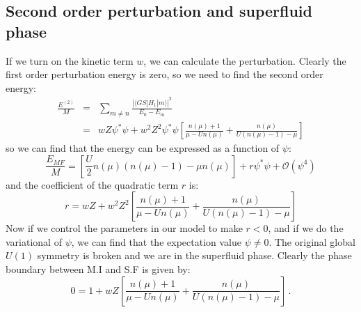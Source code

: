 \documentclass{article}
\begin{document}
\subsection{Second order perturbation and superfluid phase}
If we turn on the kinetic term $w$, we can calculate the perturbation. Clearly the first order perturbation energy is zero, so we need to find the second order energy:
\begin{eqnarray}
\frac{E^{(2)}}{M} &=& \sum_{m\neq n}\frac{|\langle GS|H_1|m\rangle|^2}{E_0-E_m}\nonumber\\
&=& wZ\psi^*\psi + w^2Z^2\psi^*\psi\left[\frac{n(\mu)+1}{\mu-Un(\mu)}+\frac{n(\mu)}{U(n(\mu)-1)-\mu}\right]
\end{eqnarray}
so we can find that the energy can be expressed as a function of $\psi$:
\begin{equation}
\frac{E_{MF}}{M} = \left[\frac{U}{2}n(\mu)(n(\mu)-1)-\mu n(\mu)\right] + r\psi^*\psi +\mathcal{O}(\psi^4)
\end{equation}
and the coefficient of the quadratic term $r$ is:
\begin{equation}
r = wZ + w^2Z^2\left[\frac{n(\mu)+1}{\mu-Un(\mu)}+\frac{n(\mu)}{U(n(\mu)-1)-\mu}\right] 
\end{equation}
Now if we control the parameters in our model to make $r<0$, and if we do the variational of $\psi$, we can find that the expectation value $\psi\neq 0$. The original global $U(1)$ symmetry is broken and we are in the superfluid phase. Clearly the phase boundary between M.I and S.F is given by:
\begin{equation}
0 = 1 + wZ \left[\frac{n(\mu)+1}{\mu-Un(\mu)}+\frac{n(\mu)}{U(n(\mu)-1)-\mu}\right]\,.
\end{equation}
\end{document}
